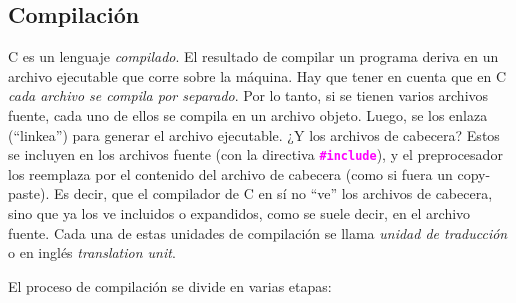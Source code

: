 \documentclass[]{scrartcl}
\newcommand{\hl}[1]{\textcolor{magenta}{\textbf{\texttt{#1}}}}
\begin{document}
\subsection*{Compilación}

C es un lenguaje \textit{compilado}. El resultado de compilar un programa deriva en un archivo ejecutable que corre sobre la máquina. Hay que tener en cuenta que en C \textit{cada archivo se compila por separado}. Por lo tanto, si se tienen varios archivos fuente, cada uno de ellos se compila en un archivo objeto. Luego, se los enlaza (``linkea'') para generar el archivo ejecutable. ¿Y los archivos de cabecera? Estos se incluyen en los archivos fuente (con la directiva \hl{\#include}), y el preprocesador los reemplaza por el contenido del archivo de cabecera (como si fuera un copy-paste). Es decir, que el compilador de C en sí no ``ve'' los archivos de cabecera, sino que ya los ve incluidos o expandidos, como se suele decir, en el archivo fuente. Cada una de estas unidades de compilación se llama \textit{unidad de traducción} o en inglés \textit{translation unit}.

El proceso de compilación se divide en varias etapas:
\end{document}

